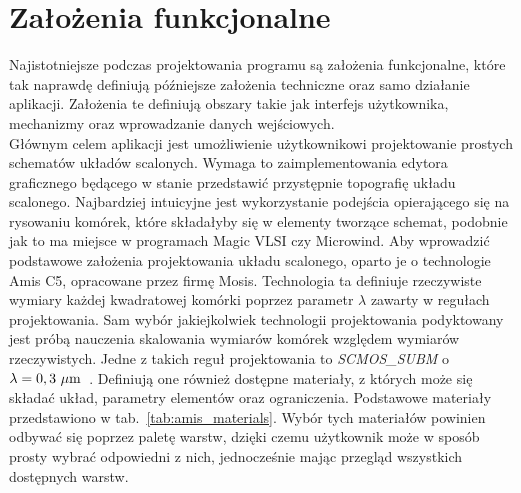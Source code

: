 \section{Założenia funkcjonalne}
\label{sec:zalozenia_funkcjonalne}

Najistotniejsze podczas projektowania programu są założenia funkcjonalne,
które tak naprawdę definiują późniejsze założenia techniczne oraz samo działanie aplikacji.
Założenia te definiują obszary takie jak interfejs użytkownika, mechanizmy oraz wprowadzanie danych wejściowych.\\
\indent Głównym celem aplikacji jest umożliwienie użytkownikowi projektowanie prostych schematów układów scalonych.
Wymaga to zaimplementowania edytora graficznego będącego w stanie przedstawić przystępnie topografię układu scalonego.
Najbardziej intuicyjne jest wykorzystanie podejścia opierającego się na rysowaniu komórek,
które składałyby się w elementy tworzące schemat, podobnie jak to ma miejsce w programach Magic VLSI czy Microwind.
Aby wprowadzić podstawowe założenia projektowania układu scalonego, oparto je o technologie Amis C5,
opracowane przez firmę Mosis.
Technologia ta definiuje rzeczywiste wymiary każdej kwadratowej komórki poprzez parametr $\lambda$
zawarty w regułach projektowania.
Sam wybór jakiejkolwiek technologii projektowania podyktowany
jest próbą nauczenia skalowania wymiarów komórek względem wymiarów rzeczywistych.
Jedne z takich reguł projektowania to \textit{SCMOS\_SUBM} o $\lambda=0,3~\text{$\mu$m}$~\cite{amis_c5, amis_params}.
Definiują one również dostępne materiały, z których może się składać układ, parametry elementów oraz ograniczenia.
Podstawowe materiały przedstawiono w tab.~\ref{tab:amis_materials}.
Wybór tych materiałów powinien odbywać się poprzez paletę warstw,
dzięki czemu użytkownik może w sposób prosty wybrać odpowiedni z nich,
jednocześnie mając przegląd wszystkich dostępnych warstw. 


